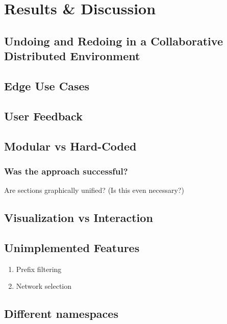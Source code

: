\chapter{Results \& Discussion}

\section{Undoing and Redoing in a Collaborative Distributed Environment}

\section{Edge Use Cases}

\section{User Feedback}

\section{Modular vs Hard-Coded}
\subsection{Was the approach successful?}
Are sections graphically unified? (Is this even necessary?)
	
\section{Visualization vs Interaction}

\section{Unimplemented Features}
	\begin{enumerate}
		\item Prefix filtering
		\item Network selection
	\end{enumerate}

\section{Different namespaces}